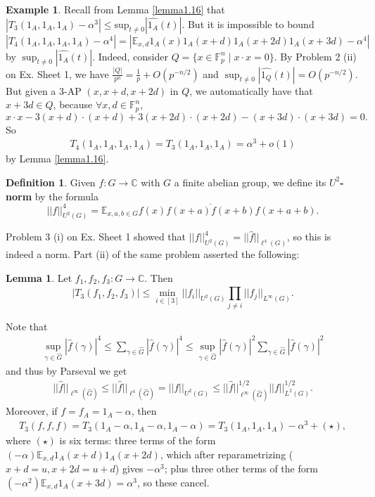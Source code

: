 \documentclass{article}
\theoremstyle{definition}
\newtheorem{lemma}[theorem]{Lemma}
\newtheorem{example}[theorem]{Example}
\newtheorem{defn}[theorem]{Definition}
\begin{document}
\begin{example}\label{example4.4}
    Recall from Lemma \ref{lemma1.16} that $|T_3(1_A,1_A,1_A) - \alpha^3| \le \text{sup}_{t\neq 0}|\widehat{1_A}(t)|$. But it is impossible to bound $$|T_4(1_A,1_A,1_A,1_A) - \alpha^4| = |\mathbb{E}_{x,d} 1_A(x)1_A(x+d)1_A(x+2d)1_A(x+3d)-\alpha^4|$$ by $\sup_{t\neq 0}|\widehat{1_A}(t)|$. Indeed, consider $Q = \{x \in \mathbb{F}_p^n \mid x\cdot x = 0\}$. By Problem 2 (ii) on Ex. Sheet 1, we have $\frac{\left|Q\right|}{p^n}= \frac{1}{p}+O(p^{-n/2})$ and $\sup_{t\neq 0} \left|\widehat{1_Q}(t)\right|=O(p^{-n/2})$. But given a 3-AP $(x,x+d,x+2d)$ in $Q$, we automatically have that $x+3d \in Q$, because $\forall x,d \in \mathbb{F}_p^n$, \[
    x\cdot x - 3(x+d)\cdot (x+d) + 3(x+2d)\cdot (x+2d) - (x+3d)\cdot (x+3d) = 0.
    \]
    So 
    \begin{align*}
        T_4(1_A,1_A,1_A,1_A) = T_3(1_A,1_A,1_A) = \alpha^3 + o(1)
    \end{align*}
    by Lemma \ref{lemma1.16}.
\end{example}
\begin{defn}
    Given $f : G \to \mathbb{C}$ with $G$ a finite abelian group, we define its \textbf{$U^2$-norm} by the formula \[
    ||f||_{U^2(G)}^4 = \mathbb{E}_{x,a,b \in G}f(x)\overline{f(x+a)f(x+b)}f(x+a+b).
    \]
\end{defn}
Problem 3 (i) on Ex. Sheet 1 showed that $||f||_{U^2(G)}^4 = ||\widehat{f}||_{\ell^4(G)}$, so this is indeed a norm. Part (ii) of the same problem asserted the following:
\begin{lemma}\label{lemma4.6}
    Let $f_1,f_2,f_3 : G \to \mathbb{C}$. Then 
    \[
    \left|T_3(f_1,f_2,f_3)\right| \le \min_{i \in [3]}||f_i||_{U^2(G)}\prod_{j \neq i}^{} ||f_j||_{L^{\infty}(G)}.
    \] 
\end{lemma}
Note that 
\begin{align*}
    \sup_{\gamma \in \widehat{G}} |\widehat{f}(\gamma)|^4 \le \sum_{\gamma \in \widehat{G}}^{} |\widehat{f}(\gamma)|^4 \le \sup_{\gamma \in \widehat{G}} |\widehat{f}(\gamma)|^2 \sum_{\gamma \in \widehat{G}}^{} |\widehat{f}(\gamma)|^2
\end{align*}
and thus by Parseval we get
\begin{align*}
    ||\widehat{f}||_{\ell^{\infty}(\widehat{G})} \le ||\widehat{f}||_{\ell^4(\widehat{G})} = ||f||_{U^2(G)} \le ||\widehat{f}||^{1/2}_{\ell^{\infty}(\widehat{G})} ||f||^{1/2}_{L^2(G)}.
\end{align*}
Moreover, if $f=f_A = 1_A - \alpha$, then
\begin{align*}
    T_3(f,f,f) = T_3(1_A-\alpha,1_A-\alpha,1_A-\alpha) = T_3(1_A,1_A,1_A) - \alpha^3 + (\star),
\end{align*}
where $(\star)$ is six terms: three terms of the form $(-\alpha)\mathbb{E}_{x,d}1_A(x+d)1_A(x+2d)$, which after reparametrizing ($x+d=u,x+2d=u+d$) gives $-\alpha^3$; plus three other terms of the form $(-\alpha^2)\mathbb{E}_{x,d}1_A(x+3d) = \alpha^3$, so these cancel.
\vspace{1mm}
 
\end{document}
